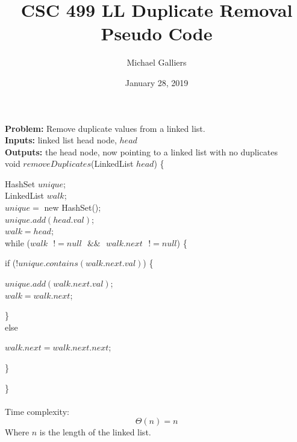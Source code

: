 \documentclass[10pt,letterpaper]{article}
\author{Michael Galliers}
\title{CSC 499 LL Duplicate Removal Pseudo Code}
\date{January 28, 2019}
\begin{document}
\begin{titlepage}
\maketitle
\end{titlepage}

\noindent
\textbf{Problem:} Remove duplicate values from a linked list.\\
\textbf{Inputs:} linked list head node, $head$\\
\textbf{Outputs:} the head node, now pointing to a linked list with no duplicates\\

\noindent
void $removeDuplicates$(LinkedList $head$)
\{
\begin{addmargin}{2em}
	HashSet $unique$;\\
	LinkedList $walk$;\\
	$unique = $ new HashSet();\\
	$unique.add(head.val)$;\\
	$walk = head$;\\
	while ($walk \text{ } != null \text{ } \&\& \text{ } walk.next \text{ } != null$) \{
	\begin{addmargin}{2em}
		if ($! unique.contains(walk.next.val)$) \{
		\begin{addmargin}{2em}
			$unique.add(walk.next.val)$;\\
			$walk = walk.next$;
		\end{addmargin}
		\}\\
		else
		\begin{addmargin}{2em}
			$walk.next = walk.next.next$;
		\end{addmargin}
	\end{addmargin}
	\}
	
	
\end{addmargin}
\}\\\\

Time complexity:
$$\Theta (n) = n$$
Where $n$ is the length of the linked list.
\end{document}
